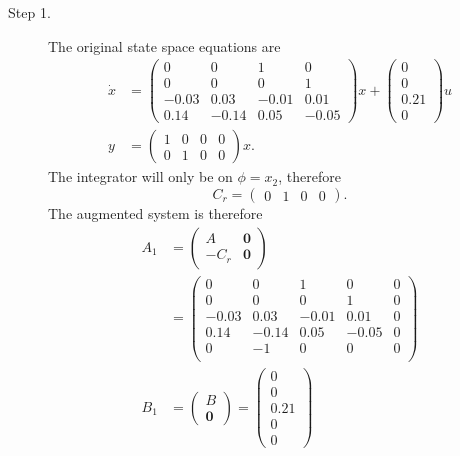 \begin{description}
\item[Step 1.]
The original state space equations are 
\begin{align*}
\dot{x} &= \begin{pmatrix} 
         0 &        0 &   1 &        0 \\
         0 &        0 &        0 &   1 \\
   -0.03 &   0.03 &  -0.01 &   0.01 \\
    0.14 &  -0.14 &   0.05 &  -0.05 
\end{pmatrix}x + \begin{pmatrix} 
 0    \\     0 \\   0.21 \\  0
\end{pmatrix} u \\
y &= \begin{pmatrix}
1 & 0 & 0 & 0 \\ 
0 & 1 & 0 & 0
\end{pmatrix}x.
\end{align*}
The integrator will only be on $\phi=x_2$, therefore 
\[
C_r = \begin{pmatrix} 0 & 1 & 0 & 0 \end{pmatrix}.
\]
The augmented system is therefore
\begin{align*}
A_1 &= \begin{pmatrix} A & \mathbf{0} \\ -C_r & \mathbf{0} \end{pmatrix}\\
 &= \begin{pmatrix} 
         0 &        0 &   1 &        0 &        0 \\
         0 &        0 &        0 &   1 &        0 \\
   -0.03 &   0.03 &  -0.01 &   0.01 &        0 \\
    0.14 &  -0.14 &   0.05 &  -0.05 &        0 \\
         0 &   -1 &        0 &        0 &        0 \\
\end{pmatrix} \\
B_1 &= \begin{pmatrix} B \\ \mathbf{0} \end{pmatrix} = \begin{pmatrix} 
0   \\      0  \\  0.21 \\  0   \\      0 
\end{pmatrix}
\end{align*}


\end{description}
